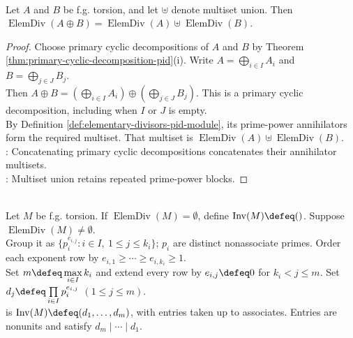 \begin{proposition} \label{prop:elementary-divisors-direct-sums} \\
Let $A$ and $B$ be f.g. torsion, and let $\uplus$ denote multiset union. Then $\operatorname{ElemDiv}(A\oplus B)=\operatorname{ElemDiv}(A)\uplus\operatorname{ElemDiv}(B)$.
\begin{proof}
Choose primary cyclic decompositions of $A$ and $B$ by Theorem \ref{thm:primary-cyclic-decomposition-pid}(i). Write $A=\bigoplus\limits_{i\in I}A_i$ and $B=\bigoplus\limits_{j\in J}B_j$.\\
Then $A\oplus B=(\bigoplus\limits_{i\in I}A_i)\oplus(\bigoplus\limits_{j\in J}B_j)$. This is a primary cyclic decomposition, including when $I$ or $J$ is empty.\\
By Definition \ref{def:elementary-divisors-pid-module}, its prime-power annihilators form the required multiset. That multiset is $\operatorname{ElemDiv}(A)\uplus\operatorname{ElemDiv}(B)$.\\
: Concatenating primary cyclic decompositions concatenates their annihilator multisets.\\
: Multiset union retains repeated prime-power blocks.
\end{proof}
\end{proposition}

\begin{definition} \label{def:invariant-factors-pid-module} \\
Let $M$ be f.g. torsion. If $\operatorname{ElemDiv}(M)=\emptyset$, define $\operatorname{Inv}(M)\defeq()$. Suppose $\operatorname{ElemDiv}(M)\neq\emptyset$.\\
Group it as $\{p_i^{e_{i,j}}:i\in I,\ 1\leq j\leq k_i\}$; $p_i$ are distinct nonassociate primes. Order each exponent row by $e_{i,1}\geq\cdots\geq e_{i,k_i}\geq1$.\\
Set $m\defeq\max\limits_{i\in I}k_i$ and extend every row by $e_{i,j}\defeq0$ for $k_i<j\leq m$. Set $d_j\defeq\prod\limits_{i\in I}p_i^{e_{i,j}}$ $(1\leq j\leq m)$.\\
 is $\operatorname{Inv}(M)\defeq(d_1,\ldots,d_m)$, with entries taken up to associates. Entries are nonunits and satisfy $d_m\mid\cdots\mid d_1$.
\end{definition}

